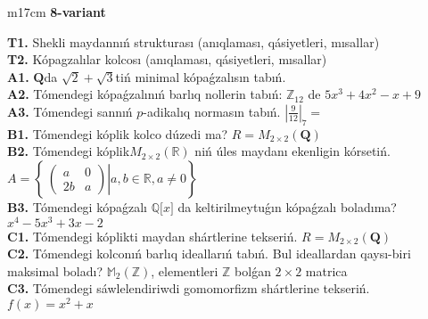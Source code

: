 \documentclass{article}
\begin{document}
\begin{tabular}{m{17cm}}
\textbf{8-variant}
\newline

\textbf{T1.} Shekli maydannıń strukturası (anıqlaması, qásiyetleri, mısallar) \\
\textbf{T2.} Kópagzalılar kolcosı (anıqlaması, qásiyetleri, mısallar) \\
\textbf{A1.} \(\mathbf{Q}\)da \(\sqrt{2} + \sqrt{3}\)tiń minimal kópaǵzalısın tabıń. \\
\textbf{A2.} Tómendegi kópaǵzalınıń barlıq nollerin tabıń: \(\mathbb{Z}_{12}\) de \(5x^{3} + 4x^{2} - x + 9\) \\
\textbf{A3.} Tómendegi sannıń \(p\)-adikalıq normasın tabıń. \(|\frac{9}{12}|_{7} =\) \\
\textbf{B1.} Tómendegi kóplik kolco dúzedi ma? \(R = M_{2 \times 2}\left( \mathbf{Q} \right)\) \\
\textbf{B2.} Tómendegi kóplik\(M_{2 \times 2}\left( \mathbb{R} \right)\) niń úles maydanı ekenligin kórsetiń. \(A = \left\{ \left. \ \begin{pmatrix}
a & 0 \\
2b & a
\end{pmatrix} \right|a,b\mathbb{\in R},a \neq 0 \right\}\) \\
\textbf{B3.} Tómendegi kópaǵzalı \(\mathbb{Q\lbrack}x\rbrack\) da keltirilmeytuǵın kópaǵzalı boladıma? \(x^{4} - 5x^{3} + 3x - 2\) \\
\textbf{C1.} Tómendegi kóplikti maydan shártlerine tekseriń. \(R = M_{2 \times 2}\left( \mathbf{Q} \right)\) \\
\textbf{C2.} Tómendegi kolconıń barlıq ideallarıń tabıń. Bul ideallardan qaysı-biri maksimal boladı? \(\mathbb{M}_{2}\left( \mathbb{Z} \right)\), elementleri \(\mathbb{Z}\) bolǵan \(2 \times 2\) matrica \\
\textbf{C3.} Tómendegi sáwlelendiriwdi gomomorfizm shártlerine tekseriń. \(f(x) = x^{2} + x\) \\

\end{tabular}
\vspace{1cm}
\end{document}
